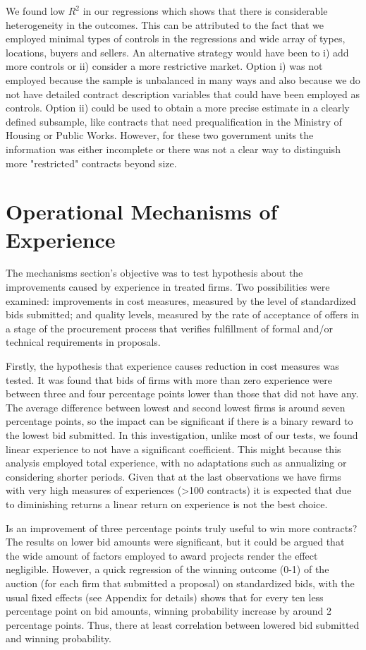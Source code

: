 We found low $R^2$ in our regressions which shows that there is considerable heterogeneity in the outcomes. This can be attributed to the fact that we employed minimal types of controls in the regressions and wide array of types, locations, buyers and sellers. An alternative strategy would have been to i) add more controls or ii) consider a more restrictive market. Option i) was not employed because the sample is unbalanced in many ways and also because we do not have detailed contract description variables that could have been employed as controls. Option ii) could be used to obtain a more precise estimate in a clearly defined subsample, like contracts that need prequalification in the Ministry of Housing or Public Works. However, for these two government units the information was either incomplete or there was not a clear way to distinguish more "restricted" contracts beyond size.

\section{Operational Mechanisms of Experience}

The mechanisms section's objective was to test hypothesis about the improvements caused by experience in treated firms. Two possibilities were examined: improvements in cost measures, measured by the level of standardized bids submitted; and  quality levels, measured by the rate of acceptance of offers in a stage of the procurement process that verifies fulfillment of formal and/or technical requirements in proposals.

Firstly, the hypothesis that experience causes reduction in cost measures was tested. It was found that bids of firms with more than zero experience were between three and four percentage points lower than those that did not have any. The average difference between lowest and second lowest firms is around seven percentage points, so the impact can be significant if there is a binary reward to the lowest bid submitted. In this investigation, unlike most of our tests, we found linear experience to not have a significant coefficient. This might because this analysis employed total experience, with no adaptations such as annualizing or considering shorter periods. Given that at the last observations we have firms with very high measures of experiences (>100 contracts) it is expected that due to diminishing returns a linear return on experience is not the best choice.

Is an improvement of three percentage points truly useful to win more contracts? The results on lower bid amounts were significant, but it could be argued that the wide amount of factors employed to award projects render the effect negligible. However, a quick regression of the winning outcome (0-1) of the auction (for each firm that submitted a proposal) on standardized bids, with the usual fixed effects (see Appendix for details) shows that for every ten less percentage point on bid amounts, winning probability increase by around 2 percentage points. Thus, there at least correlation between lowered bid submitted and winning probability.

